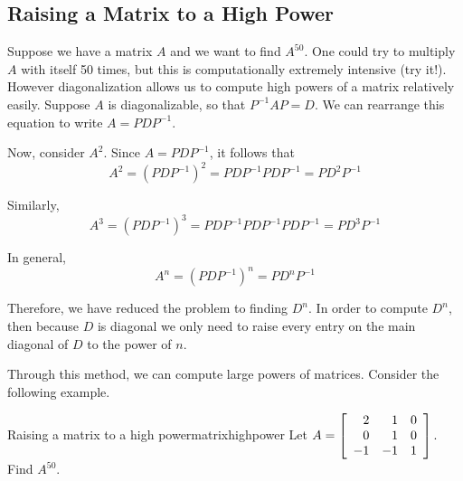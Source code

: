 \subsection{Raising a Matrix to a High Power}

Suppose we have a matrix $A$ and we want to find $A^{50}$. One could
try to multiply $A$ with itself 50 times, but this is computationally
extremely intensive (try it!). However diagonalization allows us to
compute high powers of a matrix relatively easily.  Suppose $A$ is
diagonalizable, so that $P^{-1}AP=D$. We can rearrange this equation
to write $A=PDP^{-1}$.

Now, consider $A^{2}$. Since $A=PDP^{-1}$, it follows that 
\begin{equation*}
A^{2} = \left( PDP^{-1}\right) ^{2}=PDP^{-1}PDP^{-1}=PD^{2}P^{-1}
\end{equation*}

Similarly, 
\begin{equation*}
A^3 = \left( PDP^{-1}\right) ^{3}=PDP^{-1}PDP^{-1}PDP^{-1}=PD^{3}P^{-1}
\end{equation*}

In general,
\begin{equation*}
A^n = \left( PDP^{-1}\right) ^{n}=PD^{n}P^{-1}
\end{equation*}

Therefore, we have reduced the problem to finding $D^{n}$. In order to
compute $D^{n}$, then because $D$ is diagonal we only need to raise
every entry on the main diagonal of $D$ to the power of $n$.

Through this method, we can compute large powers of matrices. Consider the following example.

\begin{example}{Raising a matrix to a high power}{matrixhighpower}
Let
  $A=\left[ 
\begin{array}{rrr}
2 & 1 & 0 \\
0 & 1 & 0 \\
-1 & -1 & 1
\end{array}
\right]. $ Find $A^{50}.$
\end{example}

